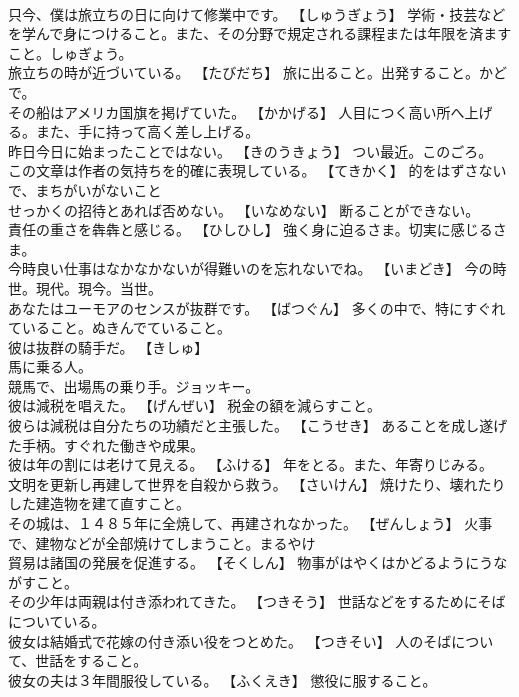 \documentclass[8pt]{extreport}
\begin{document}
\begin{CJK}{UTF8}{min}
\\	只今、僕は旅立ちの日に向けて修業中です。	【しゅうぎょう】 学術・技芸などを学んで身につけること。また、その分野で規定される課程または年限を済ますこと。しゅぎょう。
\\	旅立ちの時が近づいている。	【たびだち】 旅に出ること。出発すること。かどで。
\\	その船はアメリカ国旗を掲げていた。	【かかげる】 人目につく高い所へ上げる。また、手に持って高く差し上げる。
\\	昨日今日に始まったことではない。	【きのうきょう】 つい最近。このごろ。
\\	この文章は作者の気持ちを的確に表現している。	【てきかく】 的をはずさないで、まちがいがないこと
\\	せっかくの招待とあれば否めない。	【いなめない】 断ることができない。
\\	責任の重さを犇犇と感じる。	【ひしひし】 強く身に迫るさま。切実に感じるさま。
\\	今時良い仕事はなかなかないが得難いのを忘れないでね。	【いまどき】 今の時世。現代。現今。当世。
\\	あなたはユーモアのセンスが抜群です。	【ばつぐん】 多くの中で、特にすぐれていること。ぬきんでていること。
\\	彼は抜群の騎手だ。	【きしゅ】 
\\	馬に乗る人。 
\\	競馬で、出場馬の乗り手。ジョッキー。
\\	彼は減税を唱えた。	【げんぜい】 税金の額を減らすこと。
\\	彼らは減税は自分たちの功績だと主張した。	【こうせき】 あることを成し遂げた手柄。すぐれた働きや成果。
\\	彼は年の割には老けて見える。	【ふける】 年をとる。また、年寄りじみる。
\\	文明を更新し再建して世界を自殺から救う。	【さいけん】 焼けたり、壊れたりした建造物を建て直すこと。
\\	その城は、１４８５年に全焼して、再建されなかった。	【ぜんしょう】 火事で、建物などが全部焼けてしまうこと。まるやけ
\\	貿易は諸国の発展を促進する。	【そくしん】 物事がはやくはかどるようにうながすこと。
\\	その少年は両親は付き添われてきた。	【つきそう】 世話などをするためにそばについている。
\\	彼女は結婚式で花嫁の付き添い役をつとめた。	【つきそい】 人のそばについて、世話をすること。
\\	彼女の夫は３年間服役している。	【ふくえき】 懲役に服すること。

\end{CJK}
\end{document}
